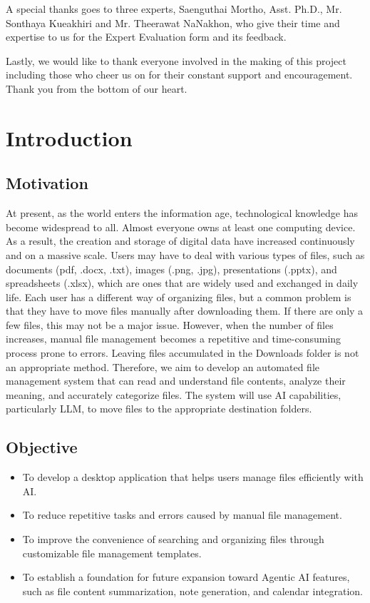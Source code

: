 \documentclass[12pt,oneside,openright,a4paper]{cpe-english-project}
\begin{document}
\vspace{0.5em}
\noindent A special thanks goes to three experts, Saenguthai Mortho, Asst. Ph.D., Mr. Sonthaya Kueakhiri and Mr. Theerawat NaNakhon, who give their time and expertise to us for the Expert Evaluation form and its feedback.

\vspace{0.5em}
\noindent Lastly, we would like to thank everyone involved in the making of this project including those who cheer us on for their constant support and encouragement. Thank you from the bottom of our heart.

\tableofcontents
\listoftables
\listoffigures

\chapter{Introduction}
\section{Motivation}
At present, as the world enters the information age, technological knowledge has become widespread to all. Almost everyone owns at least one computing device. As a result, the creation and storage of digital data have increased continuously and on a massive scale. Users may have to deal with various types of files, such as documents (pdf, .docx, .txt), images (.png, .jpg), presentations (.pptx), and spreadsheets (.xlsx), which are ones that are widely used and exchanged in daily life. Each user has a different way of organizing files, but a common problem is that they have to move files manually after downloading them. If there are only a few files, this may not be a major issue. However, when the number of files increases, manual file management becomes a repetitive and time-consuming process prone to errors. Leaving files accumulated in the Downloads folder is not an appropriate method. Therefore, we aim to develop an automated file management system that can read and understand file contents, analyze their meaning, and accurately categorize files. The system will use AI capabilities, particularly LLM, to move files to the appropriate destination folders.

\section{Objective}
\begin{itemize}
\item To develop a desktop application that helps users manage files efficiently with AI.
\item To reduce repetitive tasks and errors caused by manual file management.
\item To improve the convenience of searching and organizing files through customizable file management templates.
\item To establish a foundation for future expansion toward Agentic AI features, such as file content summarization, note generation, and calendar integration.
\end{itemize}
\end{document}
